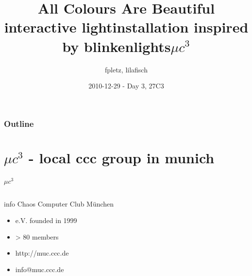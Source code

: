 \documentclass{beamer}
\title[AllColoursAreBeautiful@27c3]{All Colours Are Beautiful\\ interactive lightinstallation inspired by blinkenlights$\mu c^{3}$}
\author{fpletz, lilafisch}
\institute{from $\mu c^{3}$}
\date{2010-12-29 - Day 3, 27C3}
\begin{document}
\begin{frame}
\titlepage
\end{frame}

\begin{frame}
\frametitle{Outline}
\tableofcontents
\end{frame}
\setlength\fboxsep{5pt}
\setlength\fboxrule{0pt}
\section{$\mu c^{3}$ - local ccc group in munich}
  \begin{frame}{$\mu c^{3}$}
    \begin{columns}%
      \begin{column}{5cm}
        \begin{block}{info}
         Chaos Computer Club M\"unchen
	       \begin{itemize}
            \item e.V. founded in 1999
       	    \item > 80 members
	          \item http://muc.ccc.de
	          \item info@muc.ccc.de
    	    \end{itemize}
        \end{block}
 

\end{column}
\end{columns}
\end{frame}
\end{document}
